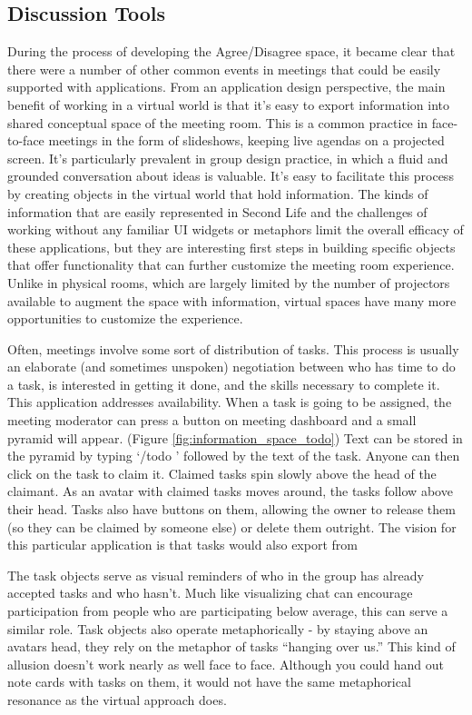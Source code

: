 \subsection{Discussion Tools}

During the process of developing the Agree/Disagree space, it became clear that there were a number of other common events in meetings that could be easily supported with applications. From an application design perspective, the main benefit of working in a virtual world is that it's easy to export information into shared conceptual space of the meeting room. This is a common practice in face-to-face meetings in the form of slideshows, keeping live agendas on a projected screen. It's particularly prevalent in group design practice, in which a fluid and grounded conversation about ideas is valuable. \citep{Dwyer:2005uj} It's easy to facilitate this process by creating objects in the virtual world that hold information. The kinds of information that are easily represented in Second Life and the challenges of working without any familiar UI widgets or metaphors limit the overall efficacy of these applications, but they are interesting first steps in building specific objects that offer functionality that can further customize the meeting room experience. Unlike in physical rooms, which are largely limited by the number of projectors available to augment the space with information, virtual spaces have many more opportunities to customize the experience.

Often, meetings involve some sort of distribution of tasks. This process is usually an elaborate (and sometimes unspoken) negotiation between who has time to do a task, is interested in getting it done, and the skills necessary to complete it. This application addresses availability. When a task is going to be assigned, the meeting moderator can press a button on meeting dashboard and a small pyramid will appear. (Figure \ref{fig:information_space_todo}) Text can be stored in the pyramid by typing `/todo ' followed by the text of the task. Anyone can then click on the task to claim it. Claimed tasks spin slowly above the head of the claimant. As an avatar with claimed tasks moves around, the tasks follow above their head. Tasks also have buttons on them, allowing the owner to release them (so they can be claimed by someone else) or delete them outright. The vision for this particular application is that tasks would also export from

The task objects serve as visual reminders of who in the group has already accepted tasks and who hasn't. Much like visualizing chat can encourage participation from people who are participating below average, this can serve a similar role. Task objects also operate metaphorically - by staying above an avatars head, they rely on the metaphor of tasks ``hanging over us.'' \citep{lakoff_metaphors_1980} This kind of allusion doesn't work nearly as well face to face. Although you could hand out note cards with tasks on them, it would not have the same metaphorical resonance as the virtual approach does.



